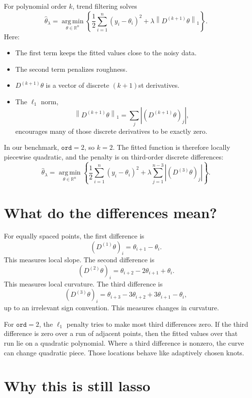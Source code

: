 \documentclass[11pt]{article}
\newcommand{\R}{\mathbb{R}}
\newcommand{\argmin}{\operatorname*{arg\,min}}
\begin{document}
For polynomial order \(k\), trend filtering solves
\[
\widehat{\theta}_{\lambda}
=
\argmin_{\theta \in \R^n}
\left\{
\frac{1}{2}\sum_{i=1}^n (y_i-\theta_i)^2
+
\lambda \left\|D^{(k+1)}\theta\right\|_1
\right\}.
\]
Here:
\begin{itemize}
  \item The first term keeps the fitted values close to the noisy data.
  \item The second term penalizes roughness.
  \item \(D^{(k+1)}\theta\) is a vector of discrete \((k+1)\)st derivatives.
  \item The \(\ell_1\) norm,
  \[
  \left\|D^{(k+1)}\theta\right\|_1
  =
  \sum_j \left|(D^{(k+1)}\theta)_j\right|,
  \]
  encourages many of those discrete derivatives to be exactly zero.
\end{itemize}

In our benchmark, \(\texttt{ord}=2\), so \(k=2\). The fitted function is
therefore locally piecewise quadratic, and the penalty is on third-order
discrete differences:
\[
\widehat{\theta}_{\lambda}
=
\argmin_{\theta \in \R^n}
\left\{
\frac{1}{2}\sum_{i=1}^n (y_i-\theta_i)^2
+
\lambda \sum_{j=1}^{n-3}
\left|(D^{(3)}\theta)_j\right|
\right\}.
\]

\section{What do the differences mean?}

For equally spaced points, the first difference is
\[
(D^{(1)}\theta)_i = \theta_{i+1}-\theta_i.
\]
This measures local slope. The second difference is
\[
(D^{(2)}\theta)_i
=
\theta_{i+2}-2\theta_{i+1}+\theta_i.
\]
This measures local curvature. The third difference is
\[
(D^{(3)}\theta)_i
=
\theta_{i+3}-3\theta_{i+2}+3\theta_{i+1}-\theta_i,
\]
up to an irrelevant sign convention. This measures changes in curvature.

For \(\texttt{ord}=2\), the \(\ell_1\) penalty tries to make most third
differences zero. If the third difference is zero over a run of adjacent
points, then the fitted values over that run lie on a quadratic polynomial.
Where a third difference is nonzero, the curve can change quadratic piece.
Those locations behave like adaptively chosen knots.

\section{Why this is still lasso}
\end{document}
